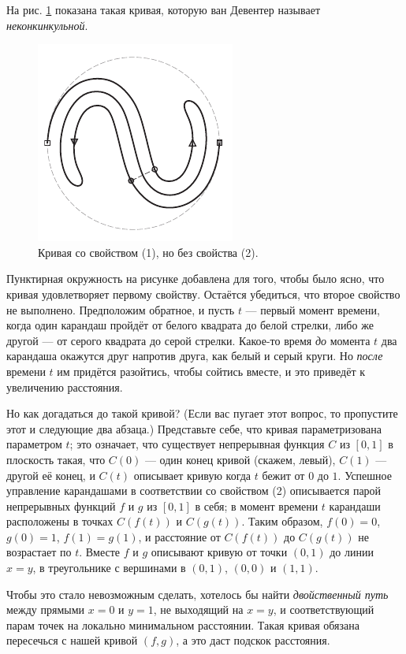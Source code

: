На рис. \ref{pic:ss-curve} показана такая кривая, которую ван Девентер называет \emph{неконкинкульной}.

\begin{figure}[htb!]
\centering
\includegraphics[scale=1]{pics/ss-curve}
\caption{Кривая со свойством (1), но без свойства (2).}
\label{pic:ss-curve}
\end{figure}

Пунктирная окружность на рисунке добавлена для того, чтобы было ясно, что кривая удовлетворяет первому свойству.
Остаётся убедиться, что второе свойство не выполнено.
Предположим обратное, и пусть $t$ --- первый момент времени, когда один карандаш пройдёт от белого квадрата до белой стрелки,
либо же другой --- от серого квадрата до серой стрелки.
Какое-то время \emph{до} момента $t$ два карандаша окажутся друг напротив друга, как белый и серый круги.
Но \emph{после} времени $t$ им придётся разойтись, чтобы сойтись вместе, и это приведёт к увеличению расстояния.

Но как догадаться до такой кривой?
(Если вас пугает этот вопрос, то пропустите этот и следующие два абзаца.)
Представьте себе, что кривая параметризована параметром $t$;
это означает, что существует непрерывная функция $C$ из $[0, 1]$ в плоскость такая, что $C(0)$ --- один конец кривой (скажем, левый), $C(1)$ --- другой её конец, и $C(t)$ описывает кривую когда $t$ бежит от $0$ до $1$.
Успешное управление карандашами в соответствии со свойством (2) описывается парой непрерывных функций $f$ и $g$ из $[0,1]$ в себя;
в момент времени $t$ карандаши расположены в точках $C(f(t))$ и $C(g(t))$.
Таким образом, $f (0) = 0$, $g(0) = 1$, $f (1) = g(1)$, и расстояние от $C(f (t))$ до $C(g(t))$ не возрастает по $t$.
Вместе $f$ и $g$ описывают кривую от точки $(0,1)$ до линии $x = y$, в треугольнике с вершинами в $(0,1)$, $(0,0)$ и $(1,1)$.

Чтобы это стало невозможным сделать, хотелось бы найти \emph{двойственный путь} между прямыми $x = 0$ и $y = 1$, не выходящий на $x = y$, и соответствующий парам точек на локально минимальном расстоянии.
Такая кривая обязана пересечься с нашей кривой $(f, g)$, а это даст подскок расстояния.

